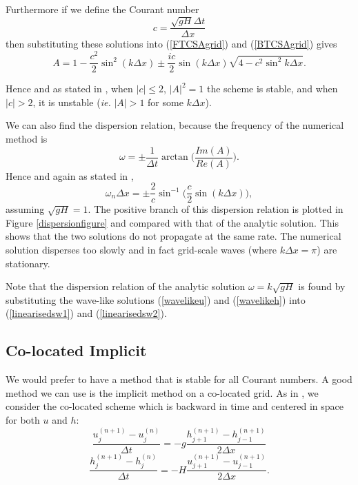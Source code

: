 \documentclass[a4paper, 10.5pt, notitlepage]{article}
\begin{document}
Furthermore if we define the Courant number 
\begin{equation}\label{Courantnumber}
c = \frac{\sqrt{gH}\Delta t}{\Delta x}
\end{equation}
then substituting these solutions into (\ref{FTCSAgrid}) and (\ref{BTCSAgrid}) gives
\begin{equation}
A = 1 - \frac{c^{2}}{2} \sin^{2}(k\Delta x) \pm \frac{ic}{2}\sin(k\Delta x)\sqrt{4 - c^{2}\sin^{2}k\Delta x}.
\end{equation} 
 
Hence and as stated in \cite{MPE textbook}, when $\lvert c \rvert \leq 2$, $\lvert A \rvert^{2} = 1$ the scheme is stable, and when $\lvert c \rvert > 2$, it is unstable (\textit{ie.} $\vert A \rvert > 1$ for some $k\Delta x$).
 
We can also find the dispersion relation, because the frequency of the numerical method is 
\begin{equation} \label{frequency}
\omega = \pm \frac{1}{\Delta t} \arctan\bigg(\frac{Im(A)}{Re(A)}\bigg).
\end{equation}
Hence and again as stated in \cite{MPE textbook}, 
\begin{equation}
\omega_{n}\Delta x = \pm \frac{2}{c} \sin^{-1} \bigg(\frac{c}{2}\sin(k\Delta x)\bigg),
\end{equation}
assuming $\sqrt{gH} = 1$. The positive branch of this dispersion relation is plotted in Figure \ref{dispersionfigure} and compared with that of the analytic solution. This shows that the two solutions do not propagate at the same rate. The numerical solution disperses too slowly and in fact grid-scale waves (where $k\Delta x = \pi$) are stationary.

Note that the dispersion relation of the analytic solution $\omega = k\sqrt{gH}$ is found by substituting the wave-like solutions (\ref{wavelikeu}) and (\ref{wavelikeh}) into (\ref{linearisedsw1}) and (\ref{linearisedsw2}). 

\subsection{Co-located Implicit}
We would prefer to have a method that is stable for all Courant numbers. A good method we can use is the implicit method on a co-located grid. As in \cite{MPE textbook}, we consider the co-located scheme which is backward in time and centered in space for both $u$ and $h$:
\begin{equation} \label{FTimplicitAgrid1}
\frac{u_{j}^{(n+1)} - u_{j}^{(n)}}{\Delta t} = -g \frac{h_{j+1}^{(n+1)} - h_{j-1}^{(n+1)}}{2\Delta x}
\end{equation}
\begin{equation}\label{FTimplicitAgrid2}
\frac{h_{j}^{(n+1)} - h_{j}^{(n)}}{\Delta t} = -H \frac{u_{j+1}^{(n+1)} - u_{j-1}^{(n+1)}}{2\Delta x}.
\end{equation}
\end{document}
